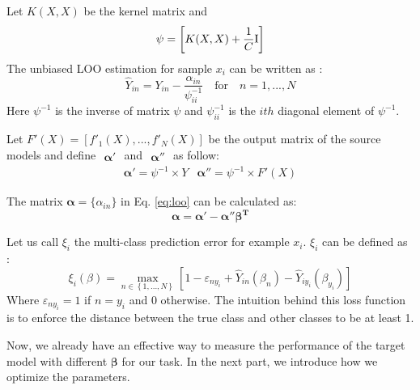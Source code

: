 Let $K(X,X)$ be the kernel matrix and
\begin{equation}\label{eq:linear}
\psi=\left[ 
{K(X,X) + \frac{1}{C}{\rm{I}}} \right]
\end{equation}
The unbiased LOO estimation for sample $x_i$ can be written as \cite{cawley2006leave}:
\begin{equation} \label{eq:loo}
{\hat Y_{in}} = {Y_{in}} - \frac{{{\alpha _{in}}}}{{\psi_{ii}^{ - 1}}}\quad {\text{for}}\quad n = 1,...,N
\end{equation}
Here $\psi^{-1}$ is the inverse of matrix $\psi$ and  $\psi_{ii}^{-1}$ is the $ith$ diagonal element of $\psi^{-1}$. 

Let $F'(X)=\left[f'_1(X),...,f'_N(X)\right]$ be the output matrix of the source models and define $\begin{array}{c}\boldsymbol{\alpha'} \end{array}$ and $\begin{array}{c}\boldsymbol{\alpha}''\end{array}$ as follow:
\begin{equation}
\begin{array}{cc}
\boldsymbol{\alpha'} =\psi^{-1} \times Y & \boldsymbol{\alpha''} =\psi^{-1} \times F'(X)
\end{array}
\end{equation}

The matrix $\boldsymbol{\alpha}=\{\alpha_{in}\}$ in Eq. \eqref{eq:loo} can be calculated as:
\begin{equation}\label{eq:solution}
 \boldsymbol{\alpha}  = \boldsymbol{\alpha} ' - \boldsymbol{\alpha} ''\boldsymbol{\beta ^T}
\end{equation}

Let us call $\xi_i$ the multi-class prediction error for example $x_i$. $\xi_i$ can be defined as \cite{crammer2002algorithmic}:
\begin{equation}\label{eq:train_loss}
\xi_i(\beta) = \mathop {\max }\limits_{n \in \left\lbrace 1,...,N \right\rbrace } {\left[ {1 - {\varepsilon _{n{y_i}}} + {{\hat Y}_{in}}\left( {\beta_n } \right) - {{\hat Y}_{i{y_i}}}\left( {\beta_{y_i} } \right)} \right]}
\end{equation}
Where $\varepsilon _{n{y_i}}=1$ if $n=y_i$ and 0 otherwise. The intuition behind this loss function is to enforce the distance between the true class and other classes to be at least 1. 



Now, we already have an effective way to measure the performance of the target model with different $\boldsymbol{\beta}$ for our task. In the next part, we introduce how we optimize the parameters.
